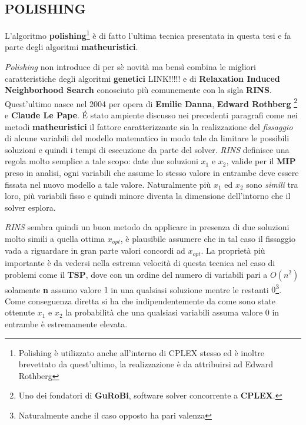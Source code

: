 \documentclass[11pt]{article}
\begin{document}
\subsection*{POLISHING}
\label{sec:polishingS}

L'algoritmo \textbf{polishing}\footnote{Polishing è utilizzato anche all'interno di CPLEX stesso ed è inoltre brevettato da quest'ultimo, la realizzazione è da attribuirsi ad Edward Rothberg} è di fatto l'ultima tecnica presentata in questa tesi e fa parte degli algoritmi \textbf{matheuristici}.

\textit{Polishing} non introduce di per sè novità ma bensì combina le migliori caratteristiche degli algoritmi \textbf{genetici} LINK!!!!! e di \textbf{Relaxation Induced Neighborhood Search} conosciuto più comunemente con la sigla \textbf{RINS}. Quest'ultimo nasce nel 2004 per opera di \textbf{Emilie Danna}, \textbf{Edward Rothberg} \footnote{Uno dei fondatori di \textbf{GuRoBi}, software solver concorrente a \textbf{CPLEX}.} e \textbf{Claude Le Pape}. \'E stato ampiente discusso nei precedenti paragrafi come nei metodi \textbf{matheuristici} il fattore caratterizzante sia la realizzazione del \textit{fissaggio} di alcune variabili del modello matematico in modo tale da limitare le possibili soluzioni e quindi i tempi di esecuzione da parte del solver. \textit{RINS} definisce una regola molto semplice a tale scopo: date due soluzioni $x_1$ e $x_2$, valide per il \textbf{MIP} preso in analisi, ogni variabili che assume lo stesso valore in entrambe deve essere fissata nel nuovo modello a tale valore. Naturalmente più $x_1$ ed $x_2$ sono \textit{simili} tra loro, più variabili fisso e quindi minore diventa la dimensione dell'intorno che il solver esplora.

\textit{RINS} sembra quindi un buon metodo da applicare in presenza di due soluzioni molto simili a quella ottima $x_{opt}$, è plausibile assumere che in tal caso il fissaggio vada a riguardare in gran parte valori concordi ad $x_{opt}$. La proprietà più importante è da vedersi nella estrema velocità di questa tecnica nel caso di problemi come il \textbf{TSP}, dove con un ordine del numero di variabili pari a \textbf{$O(n^2)$} solamente \textbf{n} assumo valore $1$ in una qualsiasi soluzione mentre le restanti $0$\footnote{Naturalmente anche il caso opposto ha pari valenza}. Come conseguenza diretta si ha che indipendentemente da come sono state ottenute $x_1$ e $x_2$ la probabilità che una qualsiasi variabili assuma valore $0$ in entrambe è estremamente elevata.
\end{document}
